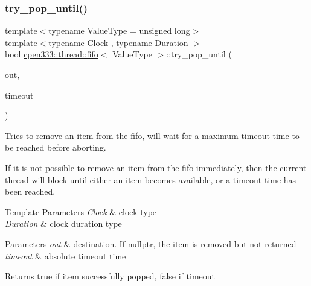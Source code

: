 \subsubsection{\texorpdfstring{try\+\_\+pop\+\_\+until()}{try\_pop\_until()}}
{\footnotesize\ttfamily template$<$typename Value\+Type  = unsigned long$>$ \\
template$<$typename Clock , typename Duration $>$ \\
bool \hyperlink{classcpen333_1_1thread_1_1fifo}{cpen333\+::thread\+::fifo}$<$ Value\+Type $>$\+::try\+\_\+pop\+\_\+until (\begin{DoxyParamCaption}\item[{Value\+Type $\ast$}]{out,  }\item[{const std\+::chrono\+::time\+\_\+point$<$ Clock, Duration $>$ \&}]{timeout }\end{DoxyParamCaption})\hspace{0.3cm}{\ttfamily [inline]}}



Tries to remove an item from the fifo, will wait for a maximum timeout time to be reached before aborting. 

If it is not possible to remove an item from the fifo immediately, then the current thread will block until either an item becomes available, or a timeout time has been reached.


\begin{DoxyTemplParams}{Template Parameters}
{\em Clock} & clock type \\
\hline
{\em Duration} & clock duration type \\
\hline
\end{DoxyTemplParams}

\begin{DoxyParams}{Parameters}
{\em out} & destination. If {\ttfamily nullptr}, the item is removed but not returned \\
\hline
{\em timeout} & absolute timeout time \\
\hline
\end{DoxyParams}
\begin{DoxyReturn}{Returns}
{\ttfamily true} if item successfully popped, {\ttfamily false} if timeout 
\end{DoxyReturn}
\mbox{\label{classcpen333_1_1thread_1_1fifo_a52254b9ca6086b9e56a07bf6e4a84a4f}} 
